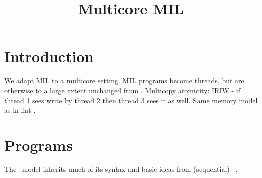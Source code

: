 
\title{Multicore MIL}

\author{}

\maketitle

\section{Introduction}
%
We adapt MIL to a multicore setting. MIL programs become threads, but are otherwise to a large extent unchanged from \cite{mil}. Multicopy atomicity: IRIW - if thread 1 sees write by thread 2 then thread 3 sees it as well. Same memory model as in flat \cite{mca-flat}.

\section{Programs}
\label{sec:programs}
%
The \MCMIL\ model inherits much of its syntax and basic ideas from (sequential) \MIL\ \cite{MIL}.


